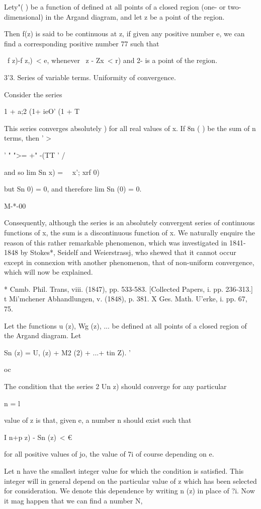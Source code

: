 Lety"( ) be a function of defined at all points of a closed region
(one- or two-dimensional) in the Argand diagram, and let z be a point
of the region.

Then f(z) is said to be continuous at z, if given any positive number
e, we can find a corresponding positive number 77 such that

\ f z)-f z,)\ < e, whenever \ z - Zx\ < r) and 2- is a point of the
region.

3'3. Series of variable terms. Uniformity of convergence.

Consider the series

  1 + a;2 (1+ ieO' (1 + T

This series converges absolutely ) for all real values of x. If
8n ( ) be the sum of n terms, then ' >

' " ">= +" -(TT ' /

and so lim Sn x) = \ \ x'; xrf 0)

but Sn 0) = 0, and therefore lim Sn (0) = 0.

M-*-00

Consequently, although the series is an absolutely convergent series
of continuous functions of x, the sum is a discontinuous function of
x. We naturally enquire the reason of this rather remarkable
phenomenon, which was investigated in 1841-1848 by Stokes*, Seidelf
and Weierstrassj, who shewed that it cannot occur except in connexion
with another phenomenon, that of non-uniform convergence, which will
now be explained.

* Cnmb. Phil. Trans, viii. (1847), pp. 533-583. [Collected Papers, i.
pp. 236-313.] t Mi'mchener Abhandlungen, v. (1848), p. 381. X Ges.
Math. U'erke, i. pp. 67, 75.

%
%

Let the functions u (z), Wg (z), ... be defined at all points of a
closed region of the Argand diagram. Let

Sn (z) = U, (z) + M2 (2) + ...+ tin Z). '

oc

The condition that the series 2 Un z) should converge for any
particular

n = l

value of z is that, given e, a number n should exist such that

I n+p z) - Sn (z)\ < €

for all positive values of jo, the value of 7i of course depending on
e.

Let n have the smallest integer value for which the condition is
satisfied. This integer will in general depend on the particular value
of z which has been selected for consideration. We denote this
dependence by writing n (z) in place of ?i. Now it mag happen that we
can find a number N,

